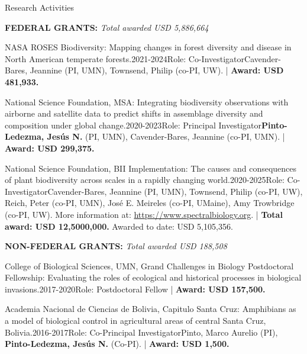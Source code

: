 \documentclass{resume} %
\begin{document}
\begin{rSection}{Research Activities}

\textbf{FEDERAL GRANTS:} \hfill {\em Total awarded USD 5,886,664}

\begin{pSubsection}{NASA ROSES Biodiversity: }{Mapping changes in forest diversity and disease in North American temperate forests.}{2021-2024}{Role: Co-Investigator}{Cavender-Bares, Jeannine (PI, UMN), Townsend, Philip (co-PI, UW). | {\bf Award: USD 481,933.}}
\end{pSubsection}

\begin{pSubsection}{National Science Foundation, MSA: }{Integrating biodiversity observations with airborne and satellite data to predict shifts in assemblage diversity and composition under global change.}{2020-2023}{Role: Principal Investigator}{}{{\bf Pinto-Ledezma, Jesús N.} (PI, UMN), Cavender-Bares, Jeannine (co-PI, UMN). | {\bf Award: USD 299,375.}}
\end{pSubsection}

\begin{pSubsection}{National Science Foundation, BII Implementation: }{The causes and consequences of plant biodiversity across scales in a rapidly changing world.}{2020-2025}{Role: Co-Investigator}{Cavender-Bares, Jeannine (PI, UMN), Townsend, Philip (co-PI, UW), Reich, Peter (co-PI, UMN), José E. Meireles (co-PI, UMaine), Amy Trowbridge (co-PI, UW). More information at: \url{https://www.spectralbiology.org}. | {\bf Total award: USD 12,5000,000.} Awarded to date: USD 5,105,356.}
\end{pSubsection}

\textbf{NON-FEDERAL GRANTS:}  \hfill {\em Total awarded USD 188,508}

\begin{pSubsection}{College of Biological Sciences, UMN, Grand Challenges in Biology Postdoctoral Fellowship: }{Evaluating the roles of ecological and historical processes in biological invasions.}{2017-2020}{Role: Postdoctoral Fellow}{ | {\bf Award: USD 157,500.}}
\end{pSubsection}

\begin{pSubsection}{Academia Nacional de Ciencias de Bolivia, Capitulo Santa Cruz: }{Amphibians as a model of biological control in agricultural areas of central Santa Cruz, Bolivia.}{2016-2017}{Role: Co-Principal Investigator}{Pinto, Marco Aurelio (PI), \textbf{Pinto-Ledezma, Jesús N.} (Co-PI). | {\bf Award: USD 1,500.}}
\end{pSubsection}


\end{rSection}
\end{document}
